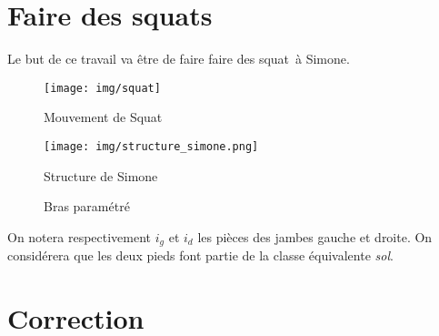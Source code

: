 
\section{Faire des squats}

Le but de ce travail va être de faire faire des \og squat\fg\ à Simone.

\begin{figure}[ht!]
\begin{minipage}{0.45\linewidth}
\begin{center}
 \texttt{[image: img/squat]}
\end{center}
\caption{\label{fig02} Mouvement de Squat}
\end{minipage}
\hfill
\begin{minipage}{0.45\linewidth}
\begin{center}
 \texttt{[image: img/structure\_simone.png]}
\end{center}
\caption{\label{fig03} Structure de Simone}
\end{minipage}
\end{figure}

\begin{figure}[h!]
\begin{center}
  \resizebox{0.4\textwidth}{!}{}
  \caption{\label{fig04} Bras paramétré}
\end{center}
\end{figure}

On notera respectivement $i_g$ et $i_d$ les pièces des jambes gauche et droite. On considérera que les deux pieds font partie de la classe équivalente \textit{sol}.




\clearpage

\ifdef{\public}{}{}

\newpage

\pagestyle{correction}\setcounter{section}{0}

\section{Correction}

